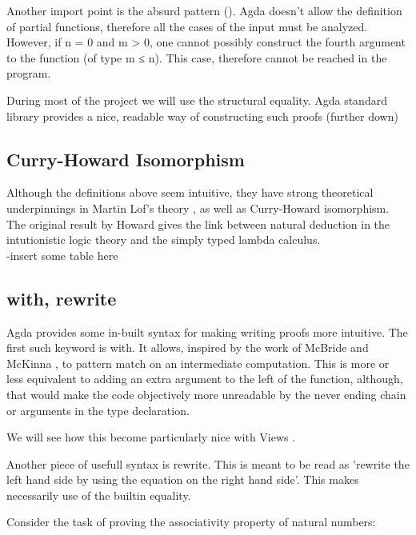\documentclass[12pt,twoside,notitlepage]{report}
\begin{document}
Another import point is the absurd pattern (). Agda doesn't allow the definition of partial functions, therefore all the cases of the
input must be analyzed. However, if n = 0 and m > 0, one cannot possibly construct the fourth argument to the function (of type m ≤ n). This case,
therefore cannot be reached in the program.

During most of the project we will use the structural equality. Agda standard library provides a nice, readable way
of constructing such proofs (further down)

\subsection{Curry-Howard Isomorphism}

Although the definitions above seem intuitive, they have strong theoretical underpinnings in Martin Lof's theory \cite{martinlof}, as well as
Curry-Howard isomorphism. The original result by Howard \cite{howard} gives the link between natural deduction in the intutionistic logic theory
and the simply typed lambda calculus. \\
-insert some table here \\

\subsection{with, rewrite}

Agda provides some in-built syntax for making writing proofs more intuitive.
The first such keyword is with. It allows, inspired by the work of McBride and McKinna \cite{viewfromtheleft},
to pattern match on an intermediate computation. This is more or less equivalent to adding an extra argument to
the left of the function, although, that would make the code objectively more unreadable by the never ending
chain or arguments in the type declaration.

We will see how this become particularly nice with Views \cite{wadler}.

Another piece of usefull syntax is rewrite. This is meant to be read as 'rewrite the left hand side
by using the equation on the right hand side'. This makes necessarily use of the builtin equality.

Consider the task of proving the associativity property of natural numbers:
\end{document}
